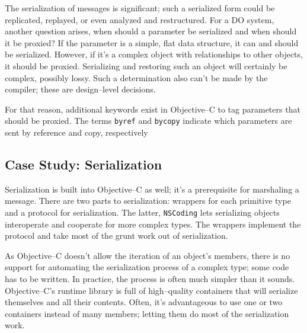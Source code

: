 	The serialization of messages is significant; such a serialized form could be replicated, replayed, or even analyzed and restructured.  For a DO system, another question arises, when should a parameter be serialized and when should it be proxied?  If the parameter is a simple, flat data structure, it can and should be serialized.  However, if it's a complex object with relationships to other objects, it should be proxied.  Serializing and restoring such an object will certainly be complex, possibly lossy.  Such a determination also can't be made by the compiler; these are design--level decisions.  

	For that reason, additional keywords exist in Objective--C to tag parameters that should be proxied.  The terms \texttt{byref} and \texttt{bycopy} indicate which parameters are sent by reference and copy, respectively

	\subsection{Case Study: Serialization}
	Serialization is built into Objective--C as well; it's a prerequisite for marshaling a message.  There are two parts to serialization: wrappers for each primitive type and a protocol for serialization.  The latter, \texttt{NSCoding} lets serializing objects interoperate and cooperate for more complex types.  The wrappers implement the protocol and take most of the grunt work out of serialization.  

	As Objective--C doesn't allow the iteration of an object's members, there is no support for automating the serialization process of a complex type; some code has to be written.  In practice, the process is often much simpler than it sounds.  Objective--C's runtime library is full of high--quality containers that will serialize themselves and all their contents.  Often, it's advantageous to use one or two containers instead of many members; letting them do most of the serialization work.

%
%
%

